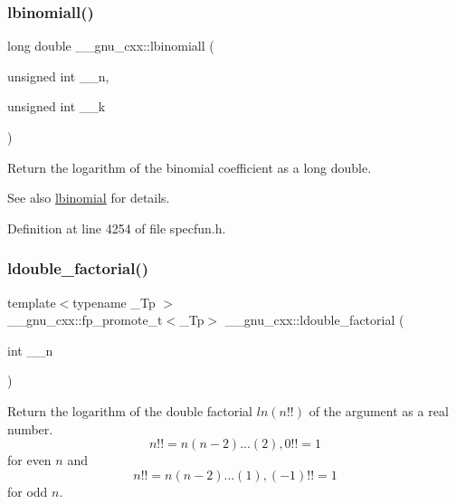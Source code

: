 \subsubsection{\texorpdfstring{lbinomiall()}{lbinomiall()}}
{\footnotesize\ttfamily long double \+\_\+\+\_\+gnu\+\_\+cxx\+::lbinomiall (\begin{DoxyParamCaption}\item[{unsigned int}]{\+\_\+\+\_\+n,  }\item[{unsigned int}]{\+\_\+\+\_\+k }\end{DoxyParamCaption})\hspace{0.3cm}{\ttfamily [inline]}}

Return the logarithm of the binomial coefficient as a {\ttfamily long double}.

\begin{DoxySeeAlso}{See also}
\hyperlink{group__gnu__math__spec__func_gabfa5aeba56edfa110846fc8e76963bc2}{lbinomial} for details. 
\end{DoxySeeAlso}


Definition at line 4254 of file specfun.\+h.

\mbox{\label{group__gnu__math__spec__func_ga43bf9a20282d5b9237bf352682a48395}} 
\subsubsection{\texorpdfstring{ldouble\+\_\+factorial()}{ldouble\_factorial()}}
{\footnotesize\ttfamily template$<$typename \+\_\+\+Tp $>$ \\
\+\_\+\+\_\+gnu\+\_\+cxx\+::fp\+\_\+promote\+\_\+t$<$\+\_\+\+Tp$>$ \+\_\+\+\_\+gnu\+\_\+cxx\+::ldouble\+\_\+factorial (\begin{DoxyParamCaption}\item[{int}]{\+\_\+\+\_\+n }\end{DoxyParamCaption})\hspace{0.3cm}{\ttfamily [inline]}}



Return the logarithm of the double factorial $ ln(n!!) $ of the argument as a real number. \[ n!! = n(n-2)...(2), 0!! = 1 \] for even $ n $ and \[ n!! = n(n-2)...(1), (-1)!! = 1 \] for odd $ n $. 



